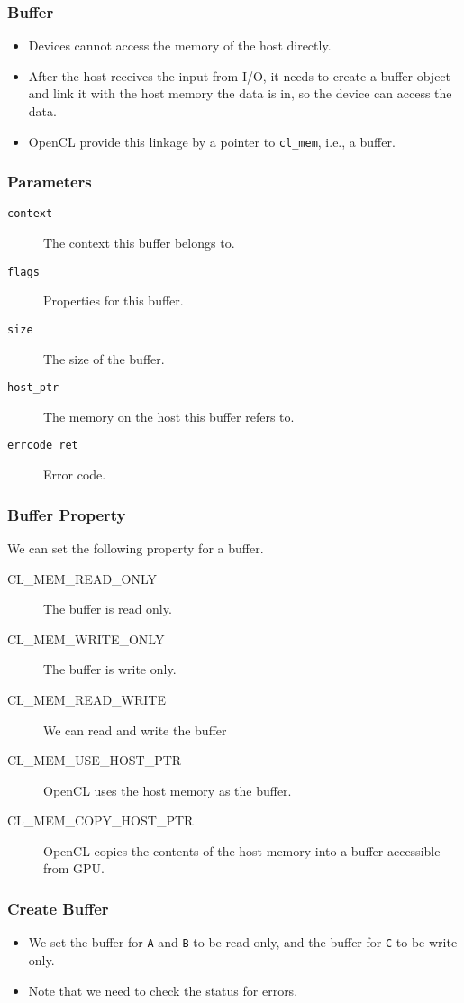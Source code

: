 \documentclass{beamer}
\begin{document}
\begin{frame}
  \frametitle{Buffer}
  \begin{itemize}
  \item Devices cannot access the memory of the host directly.
  \item After the host receives the input from I/O, it needs to
    create a buffer object and link it with the host memory the data
    is in, so the device can access the data.  
  \item OpenCL provide this linkage by a pointer to {\tt cl\_mem},
    i.e., a buffer.
  \end{itemize}
\end{frame}

\begin{frame}
\end{frame}

\begin{frame}
  \frametitle{Parameters}
  \begin{description}
  \item [\tt context] The context this buffer belongs to.
  \item [\tt flags] Properties for this buffer.
  \item [\tt size] The size of the buffer.
  \item [\tt host\_ptr] The memory on the host this buffer refers to.
  \item [\tt errcode\_ret] Error code.
  \end{description}
\end{frame}

\begin{frame}
  \frametitle{Buffer Property}
  We can set the following property for a buffer.
  \begin{description}
  \item[CL\_MEM\_READ\_ONLY] The buffer is read only.
  \item[CL\_MEM\_WRITE\_ONLY] The buffer is write only.
  \item[CL\_MEM\_READ\_WRITE] We can read and write the buffer
  \item[CL\_MEM\_USE\_HOST\_PTR] OpenCL uses the host memory as the buffer.
  \item[CL\_MEM\_COPY\_HOST\_PTR] OpenCL copies the contents of the
    host memory into a buffer accessible from GPU.
  \end{description}
\end{frame}

\begin{frame}
  \frametitle{Create Buffer}
  \begin{itemize}
  \item We set the buffer for {\tt A} and {\tt B} to be read only,
    and the buffer for {\tt C} to be write only.
  \item Note that we need to check the status for errors.
  \end{itemize}
\end{frame}
\end{document}
